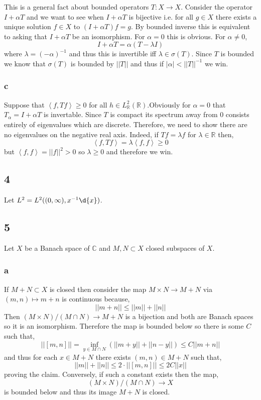 \documentclass[12pt]{article}
\newcommand{\inner}[2]{\left< #1, #2 \right>}
\newcommand{\R}{\mathbb{R}}
\renewcommand{\C}{\mathbb{C}}
\begin{document}
This is a general fact about bounded operators $T : X \to X$. Consider the operator $I + \alpha T$ and we want to see when $I + \alpha T$ is bijective i.e. for all $g \in X$ there exists a unique solution $f \in X$ to $(I + \alpha T) f = g$. By bounded inverse this is equivalent to asking that $I + \alpha T$ be an isomorphism. For $\alpha = 0$ this is obvious. For $\alpha \neq 0$,
\[ I + \alpha T = \alpha (T - \lambda I) \]
where $\lambda = (-\alpha)^{-1}$ and thus this is invertible iff $\lambda \in \sigma(T)$. Since $T$ is bounded we know that $\sigma(T)$ is bounded by $|| T ||$ and thus if $| \alpha | < || T ||^{-1}$ we win. 

\subsubsection{c}

Suppose that $\inner{f}{Tf} \ge 0$ for all $h \in L^2_\R(\R)$.Obviously for $\alpha = 0$ that $T_\alpha = I + \alpha T$ is invertable. Since $T$ is compact its spectrum away from $0$ consists entirely of eigenvalues which are discrete. Therefore, we need to show there are no eigenvalues on the negative real axis. Indeed, if $T f = \lambda f$ for $\lambda \in \R$ then,
\[ \inner{f}{T f} = \lambda \inner{f}{f} \ge 0 \]
but $\inner{f}{f} = || f ||^2 > 0$ so $\lambda \ge 0$ and therefore we win.

\subsection{4}

Let $L^2 = L^2((0, \infty), x^{-1} \d{x})$. 

\subsection{5}

Let $X$ be a Banach space of $\C$ and $M, N \subset X$ closed subspaces of $X$. 

\subsubsection{a}

If $M + N \subset X$ is closed then consider the map $M \times N \to M + N$ via $(m,n) \mapsto m + n$ is continuous because,
\[ || m + n || \le || m || + || n || \]
Then $(M \times N)/(M \cap N) \to M + N$ is a bijection and both are Banach spaces so it is an isomorphism. Therefore the map is bounded below so there is some $C$ such that,
\[ || [m, n] || = \inf_{y \in M \cap N} \left( || m + y || + || n - y|| \right) \le C || m + n || \]
and thus for each $x \in M + N$ there exists $(m,n) \in M + N$ such that,
\[ || m || + || n || \le 2 \cdot || [m, n] || \le 2 C || x || \]
proving the claim. Conversely, if such a constant exists then the map,
\[ (M \times N)/(M \cap N) \to X \]
is bounded below and thus its image $M + N$ is closed. 
\end{document}
